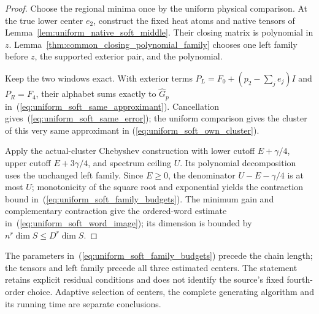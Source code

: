 \begin{proof}\leanok
    Choose the regional minima once by the uniform physical comparison.
    At the true lower center $e_2$, construct the fixed heat atoms and
    native tensors of Lemma~\ref{lem:uniform_native_soft_middle}.
    Their closing matrix is polynomial in $z$.
    Lemma~\ref{thm:common_closing_polynomial_family} chooses one left
    family before $z$, the supported exterior pair, and the polynomial.

    Keep the two windows exact. With exterior terms
    $P_L=F_0+(p_2-\sum_j e_j)I$ and $P_R=F_4$, their alphabet sums
    exactly to $\widehat G_p$ in~(\ref{eq:uniform_soft_same_approximant}).
    Cancellation gives~(\ref{eq:uniform_soft_same_error}); the uniform
    comparison gives the cluster of this very same approximant in
    (\ref{eq:uniform_soft_own_cluster}).

    Apply the actual-cluster Chebyshev construction with lower cutoff
    $E+\gamma/4$, upper cutoff $E+3\gamma/4$, and spectrum ceiling $U$.
    Its polynomial decomposition uses the unchanged left family.
    Since $E\ge0$, the denominator $U-E-\gamma/4$ is at most $U$;
    monotonicity of the square root and exponential yields the
    contraction bound in~(\ref{eq:uniform_soft_family_budgets}).
    The minimum gain and complementary contraction give the ordered-word
    estimate in~(\ref{eq:uniform_soft_word_image}); its dimension is
    bounded by $n^r\dim S\le D^r\dim S$.
\end{proof}

The parameters in~(\ref{eq:uniform_soft_family_budgets}) precede the
chain length; the tensors and left family precede all three estimated
centers. The statement retains explicit residual conditions and does
not identify the source's fixed fourth-order choice. Adaptive selection
of centers, the complete generating algorithm and its running time
are separate conclusions.


